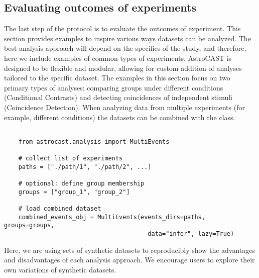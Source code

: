\subsection{Evaluating outcomes of experiments}

The last step of the protocol is to evaluate the outcomes of experiment. This section provides examples to inspire various ways datasets can be analyzed. The best analysis approach will depend on the specifics of the study, and therefore, here we include examples of common types of experiments. AstroCAST is designed to be flexible and modular, allowing for custom addition of analyses tailored to the specific dataset. The examples in this section focus on two primary types of analyses: comparing groups under different conditions (Conditional Contrasts) and detecting coincidences of independent stimuli (Coincidence Detection). When analyzing data from multiple experiments (for example, different conditions) the datasets can be combined with the  class.

\begin{lstlisting}[style=pyStyle]

    from astrocast.analysis import MultiEvents

    # collect list of experiments
    paths = ["./path/1", "./path/2", ...]

    # optional: define group membership
    groups = ["group_1", "group_2"]

    # load combined dataset
    combined_events_obj = MultiEvents(events_dirs=paths, groups=groups,
                                        data="infer", lazy=True)

\end{lstlisting}

Here, we are using sets of synthetic datasets to reproducibly show the advantages and disadvantages of each analysis approach. We encourage users to explore their own variations of synthetic datasets.

